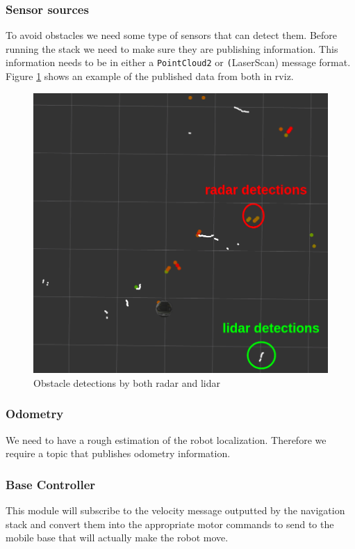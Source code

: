 \subsubsection{Sensor sources}
To avoid obstacles we need some type of sensors that can detect them. Before running the stack we need to make sure they are publishing information.
This information needs to be in either a  \texttt{PointCloud2} or \texttt(LaserScan) message format.
Figure \ref{fig:sensors} shows an example of the published data from both in rviz.
\begin{figure}[!htb]
    \centering
    \includegraphics[scale=0.5]{imgs/chapter3/sensors2.png}
    \caption{Obstacle detections by both radar and lidar}
    \label{fig:sensors}
\end{figure}
\subsubsection{Odometry}
We need to have a rough estimation of the robot localization. Therefore we require a topic that publishes odometry information.
\subsubsection{Base Controller}
This module will subscribe to the velocity message outputted by the navigation stack and convert them into the appropriate motor commands to send to the mobile base that will actually make the robot move.
